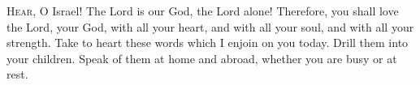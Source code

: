 \lettrine[loversize=0.15,lines=2]{H}{ear,} O Israel! The Lord is our God, the Lord alone! Therefore, you shall love the Lord, your God, with all your heart, and with all your soul, and with all your strength. Take to heart these words which I enjoin on you today. Drill them into your children. Speak of them at home and abroad, whether you are busy or at rest.
